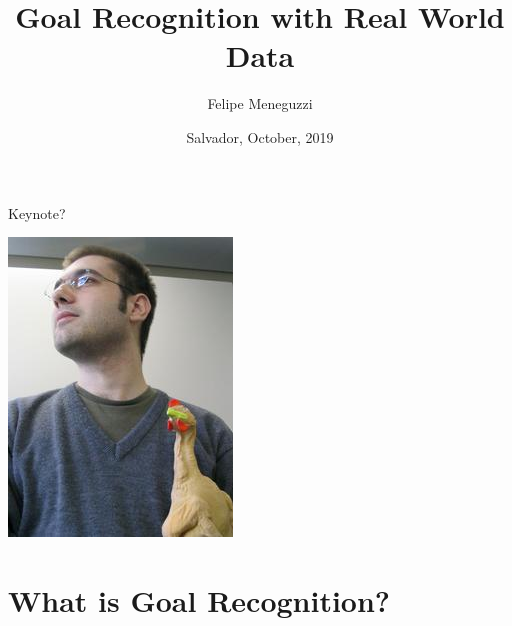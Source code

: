 \documentclass[usenames,dvipsnames]{beamer}
\title[\fontsize{0.08cm}{1em}\selectfont Goal Recognition with Real World Data]{Goal Recognition with Real World Data}
\author[Meneguzzi]{Felipe Meneguzzi\dag
}
\institute[]{\dag Pontifical Catholic University of Rio Grande do Sul, Brazil
\\
\url{felipe.meneguzzi@pucrs.br}
}
\date{Salvador, October, 2019}
\begin{document}

    \begin{frame}
        \titlepage
    \end{frame}
	\logo{}
    
	\begin{frame}[c]{Keynote?}
		\begin{center}
			\includegraphics[height=.8\textheight]{fig/felipe1.jpg}
		\end{center}
	\end{frame}
\section{What is Goal Recognition?}

\end{document}
